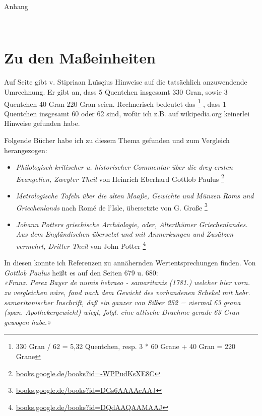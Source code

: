 \documentclass[a5paper,fontsize=10pt]{memoir}
\begin{document}
{\centering
{\Large Anhang}
\vspace{2em}

\begin{minipage}{4cm}
  \hrulefill\\
\end{minipage}

}

\section{Zu den Maßeinheiten}

Auf Seite \pageref{units_value_page} gibt
v. Stipriaan Luïsçius
Hinweise auf die tatsächlich anzuwendende Umrechnung.
Er gibt an,
dass 5  Quentchen insgesamt 330 Gran,
sowie 3 Quentchen 40 Gran 220 Gran seien.
Rechnerisch bedeutet das%
\footnote{330 Gran / 62 = 5,32 Quentchen,
resp. 3 * 60 Grane + 40 Gran = 220 Grane}%
, dass 1 Quentchen insgesamt 60 oder 62 sind,
wofür ich z.B. auf wikipedia.org keinerlei Hinweise gefunden habe.

Folgende Bücher habe ich zu diesem Thema gefunden
und zum Vergleich herangezogen:
\begin{itemize}
\item \emph{Philologisch-kritischer u. historischer Commentar
über die drey ersten Evangelien, Zweyter Theil}
von Heinrich Eberhard Gottlob Paulus%
\footnote{\href{https://books.google.de/books?id=-WPPudKsXE8C}
{books.google.de/books?id=-WPPudKsXE8C}}
\item \emph{Metrologische Tafeln über die alten Maaße,
Gewichte und Münzen Roms und Griechenlands}
nach Romé de l'Isle,
übersetzte von G. Große%
\footnote{\href{https://books.google.de/books?id=DGs6AAAAcAAJ}
{books.google.de/books?id=DGs6AAAAcAAJ}}
\item \emph{Johann Potters griechische Archäologie,
oder, Alterthümer Griechenlandes.
Aus dem Engländischen übersetzt
und mit Anmerkungen und Zusätzen vermehrt, Dritter Theil}
von John Potter%
\footnote{\href{https://books.google.de/books?id=DQdAAQAAMAAJ}{books.google.de/books?id=DQdAAQAAMAAJ}}
\end{itemize}
In diesen konnte ich Referenzen zu annähernden Wertentsprechungen finden.
Von \emph{Gottlob Paulus} heißt es auf den Seiten 679 u. 680:\\

\emph{«Franz. Perez Bayer de numis hebraeo - samaritanis (1781.)
welcher hier vorn. zu vergleichen wäre,
fand nach dem Gewicht des vorhandenen Schekel
mit hebr. samaritanischer Inschrift,
daß ein ganzer von Silber
252 = viermal 63 grana (span. Apothekergewicht) wiegt,
folgl. eine attische Drachme gerade 63 Gran gewogen habe.»}\\
\end{document}
